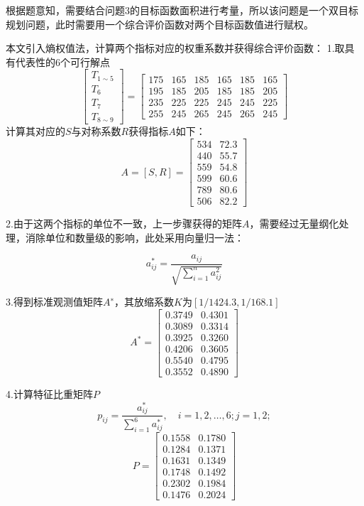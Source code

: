 \documentclass[../main.tex]{subfiles}
\begin{document}
根据题意知，需要结合问题3的目标函数面积进行考量，所以该问题是一个双目标规划问题，此时需要用一个综合评价函数对两个目标函数值进行赋权。

本文引入熵权值法，计算两个指标对应的权重系数并获得综合评价函数：
1.取具有代表性的6个可行解点
\[
\begin{bmatrix}
T_{1 \sim 5} \\
T_{6}\\
T_{7}\\
T_{8 \sim 9}
\end{bmatrix}
=
\begin{bmatrix}
175 & 165 & 185 & 165 & 185 & 165\\
195 & 185 & 205 & 185 & 185 & 205\\
235 & 225 & 225 & 245 & 245 & 225\\
255 & 245 & 265 & 245 & 265 & 245
\end{bmatrix}
\]
计算其对应的\(S\)与对称系数\(R\)获得指标\(A\)如下：
\begin{equation}
A = [S,R] =
\begin{bmatrix}
534 & 72.3 \\
440 & 55.7 \\
559 & 54.8 \\
599 & 60.6 \\
789 & 80.6 \\
506 & 82.2
\end{bmatrix}
\end{equation}

2.由于这两个指标的单位不一致，上一步骤获得的矩阵\(A\)，需要经过无量纲化处理，消除单位和数量级的影响，此处采用向量归一法：

\begin{equation}
a_{ij} ^{*} = \frac{a_{ij}}{\sqrt{\sum_{i=1}^{n} a _{ij} ^{2}}}
\end{equation}

3.得到标准观测值矩阵\(A^∗\)，其放缩系数\(K\)为\([1/1424.3,  1 / 168.1]\)
\[
A ^{*}
=
\begin{bmatrix}
0.3749 & 0.4301 \\
0.3089 & 0.3314 \\
0.3925 & 0.3260 \\
0.4206 & 0.3605 \\
0.5540 & 0.4795 \\
0.3552 & 0.4890
\end{bmatrix}
\]

4.计算特征比重矩阵\(P\)
\begin{equation}
p_{ij} = \frac{a^{*}_{ij}}{\sum_{i=1}^{6}a ^{*}_{ij}}, \quad i = 1,2 ,\dots, 6; j = 1,2;
\end{equation}
\[
P =
\begin{bmatrix}
0.1558  &  0.1780 \\
0.1284  &  0.1371 \\
0.1631  &  0.1349 \\
0.1748  &  0.1492 \\
0.2302  &  0.1984 \\
0.1476  &  0.2024
\end{bmatrix}
\]
\end{document}
